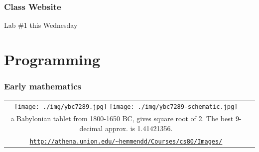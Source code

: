 \documentclass[11pt]{beamer}
\begin{document}

\begin{frame}[plain,c]
  \frametitle{Class Website}
  \Enlarge

  \begin{center}
    \textcolor{\CSBase}{\Huge Lab \#1 this Wednesday}
  \end{center}
\end{frame}





\section{Programming}

\begin{frame}[fragile]
  \frametitle{Early mathematics}

  \begin{tabular}{cc}
  \texttt{[image: ./img/ybc7289.jpg]}
  \texttt{[image: ./img/ybc7289-schematic.jpg]}\\
  {\tiny a Babylonian tablet from 1800-1650 BC, gives square root of 2. The best 9-decimal approx. is 1.41421356.}\\
  \textcolor{\CSBase}{\tiny \texttt{\url{http://athena.union.edu/~hemmendd/Courses/cs80/Images/}}}
  \end{tabular}
\end{frame}
\end{document}
